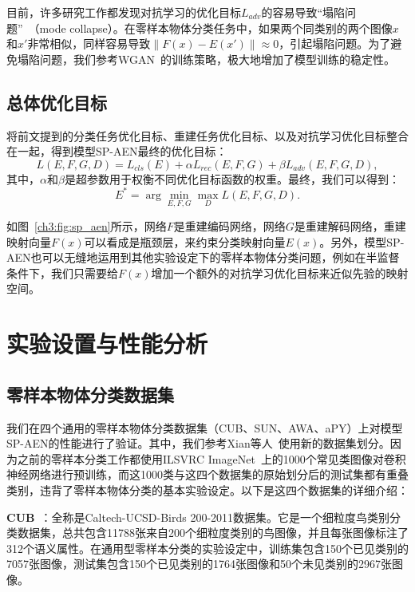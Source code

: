 目前，许多研究工作都发现对抗学习的优化目标$L_{adv}$的容易导致“塌陷问题”~\cite{arjovsky2017wasserstein}（mode collapse）。在零样本物体分类任务中，如果两个同类别的两个图像$x$和$x'$非常相似，同样容易导致$\|F(x)-E(x')\|\approx 0$，引起塌陷问题。为了避免塌陷问题，我们参考WGAN~\cite{arjovsky2017wasserstein}的训练策略，极大地增加了模型训练的稳定性。


\subsection{总体优化目标}
将前文提到的分类任务优化目标、重建任务优化目标、以及对抗学习优化目标整合在一起，得到模型SP-AEN最终的优化目标：
\begin{equation} \label{ch3:eq:eq_5}
L (E, F, G, D) = L_{cls}(E) + \alpha L_{rec} (E, F, G) + \beta L_{adv}(E, F, G, D),
\end{equation}
其中，$\alpha$和$\beta$是超参数用于权衡不同优化目标函数的权重。最终，我们可以得到：
\begin{equation}\label{ch3:eq:eq_6}
E^* = \arg\min\limits_{E, F, G}\max\limits_{D} L(E, F, G, D).
\end{equation}

如图~\ref{ch3:fig:sp_aen}所示，网络$F$是重建编码网络，网络$G$是重建解码网络，重建映射向量$F(x)$可以看成是瓶颈层，来约束分类映射向量$E(x)$。另外，模型SP-AEN也可以无缝地运用到其他实验设定下的零样本物体分类问题，例如在半监督条件下，我们只需要给$F(x)$增加一个额外的对抗学习优化目标来近似先验的映射空间。


\section{实验设置与性能分析}
\subsection{零样本物体分类数据集}

我们在四个通用的零样本物体分类数据集（CUB、SUN、AWA、aPY）上对模型SP-AEN的性能进行了验证。其中，我们参考Xian等人~\cite{xian2017zero}使用新的数据集划分。因为之前的零样本分类工作都使用ILSVRC ImageNet~\cite{russakovsky2015imagenet}上的1000个常见类图像对卷积神经网络进行预训练，而这1000类与这四个数据集的原始划分后的测试集都有重叠类别，违背了零样本物体分类的基本实验设定。以下是这四个数据集的详细介绍：

\textbf{CUB}~\cite{wah2011caltech}：全称是Caltech-UCSD-Birds 200-2011数据集。它是一个细粒度鸟类别分类数据集，总共包含11788张来自200个细粒度类别的鸟图像，并且每张图像标注了312个语义属性。在通用型零样本分类的实验设定中，训练集包含150个已见类别的7057张图像，测试集包含150个已见类别的1764张图像和50个未见类别的2967张图像。

